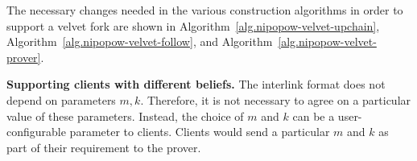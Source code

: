 The necessary changes needed in the various construction algorithms in order to
support a velvet fork are shown in
Algorithm~\ref{alg.nipopow-velvet-upchain},
Algorithm~\ref{alg.nipopow-velvet-follow}, and
Algorithm~\ref{alg.nipopow-velvet-prover}.

\ifndss\else
\noindent\textbf{Supporting clients with different beliefs.}
The interlink format does not depend on parameters $m, k$. Therefore, it is not
necessary to agree on a particular value of these parameters. Instead, the
choice of $m$ and $k$ can be a user-configurable parameter to clients.
Clients would send a particular $m$ and $k$ as part of their requirement to
the prover.
\fi
